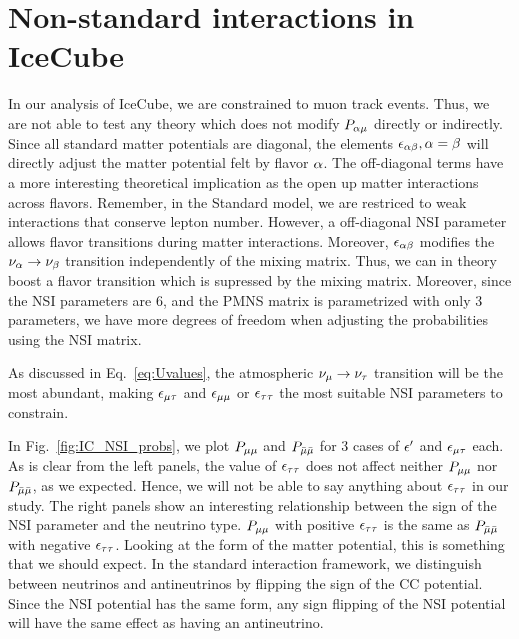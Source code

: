\documentclass[draft=True]{thesis}
\begin{document}
\section{Non-standard interactions in IceCube}
In our analysis of IceCube, we are constrained to muon track events. Thus, we are not able to test any theory which does not modify $P_{\alpha \mu}$ directly or 
indirectly. Since all standard matter potentials are diagonal, the elements $\epsilon_{\alpha\beta}, \alpha = \beta$ will directly adjust the matter potential felt 
by flavor $\alpha$. The off-diagonal terms have a more interesting theoretical implication as the open up matter interactions across flavors. Remember, in the Standard model,
we are restriced to weak interactions that conserve lepton number. However, a off-diagonal NSI parameter allows flavor transitions during matter interactions.
Moreover, $\epsilon_{\alpha\beta}$ modifies the $\nu_{\alpha} \to \nu_{\beta}$ transition independently
of the mixing matrix. Thus, we can in theory boost a flavor transition which is supressed by the mixing matrix. Moreover, since the NSI parameters are 6, and the PMNS
matrix is parametrized with only 3 parameters, we have more degrees of freedom when adjusting the probabilities using the NSI matrix.

As discussed in Eq.~\ref{eq:Uvalues}, the atmospheric $\nu_\mu \to \nu_\tau$ transition will be the most abundant, making $\epsilon_{\mu\tau}$ and $\epsilon_{\mu\mu}$ or $\epsilon_{\tau\tau}$ the most suitable
NSI parameters to constrain. 

In Fig.~\ref{fig:IC_NSI_probs}, we plot $P_{\mu\mu}$ and $P_{\bar{\mu} \bar{\mu}}$ for 3 cases of $\epsilon^\prime$ and $\epsilon_{\mu\tau}$ each. As is clear from the 
left panels, the value of $\epsilon_{\tau\tau}$ does not affect neither $P_{\mu\mu}$ nor $P_{\bar{\mu} \bar{\mu}}$, as we expected. Hence, we will not be able
to say anything about $\epsilon_{\tau\tau}$ in our study. The right panels show an interesting relationship between the sign of the NSI parameter 
and the neutrino type. $P_{\mu\mu}$ with positive $\epsilon_{\tau\tau}$ is the same as $P_{\bar{\mu} \bar{\mu}}$ with negative $\epsilon_{\tau\tau}$. Looking at the form of the matter potential, 
this is something that we should expect. In the standard interaction framework, we distinguish between neutrinos and antineutrinos by flipping the sign 
of the CC potential. Since the NSI potential has the same form, any sign flipping of the NSI potential will have the same effect as 
having an antineutrino.
\end{document}
